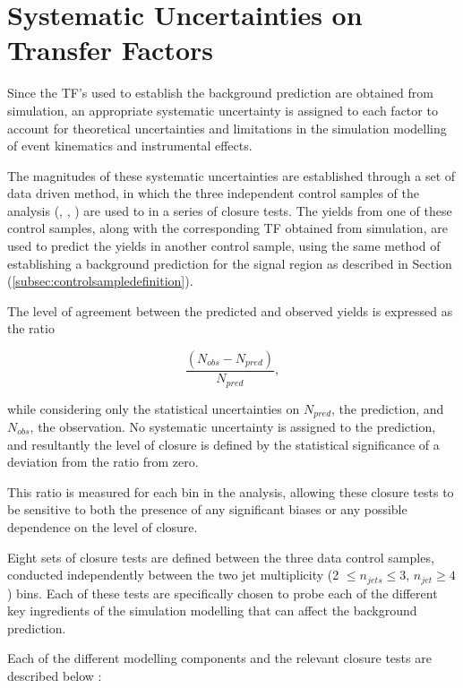 \section{Systematic Uncertainties on Transfer Factors}
\label{subsec:sysuncertainties}

Since the \ac{TF}'s used to establish the background prediction are obtained from simulation, an appropriate systematic uncertainty is assigned to each factor to account for theoretical uncertainties \cite{Bern:2011pa} and limitations in the simulation modelling of event kinematics and instrumental effects. 

The magnitudes of these systematic uncertainties are established through a set of data driven method, in which the three independent control samples of the analysis (\mupjets, \dimupjets, \gpjets) are used to in a series of closure tests. The yields from one of these control samples, along with the corresponding \ac{TF} obtained from simulation, are used to predict the yields in another control sample, using the same method of establishing a background prediction for the signal region as described in Section (\ref{subsec:controlsampledefinition}).

The level of agreement between the predicted and observed yields is expressed as the ratio 

\begin{equation}
\label{eq:closuretests}
\frac{(N_{obs}-N_{pred})}{N_{pred}},
\end{equation}

while considering only the statistical uncertainties on $N_{pred}$, the prediction, and $N_{obs}$, the observation. No systematic uncertainty is assigned to the prediction, and resultantly the level of closure is defined by the statistical significance of a deviation from the ratio from zero.

This ratio is measured for each \theht bin in the analysis, allowing these closure tests to be sensitive to both the presence of any significant biases or any possible \theht dependence on the level of closure.

Eight sets of closure tests are defined between the three data control samples, conducted independently between the two jet multiplicity (2 $\leq n_{jets} \leq 3$, $n_{jet} \geq 4$ ) bins. Each of these tests are specifically chosen to probe each of the different key ingredients of the simulation modelling that can affect the background prediction.

Each of the different modelling components and the relevant closure tests are described below :

